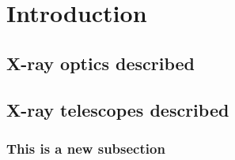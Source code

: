 \chapter{Introduction}
\section{X-ray optics described}
\section{X-ray telescopes described}
\subsection{This is a new subsection}
